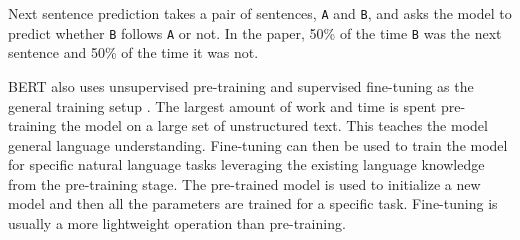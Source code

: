 \documentclass[twoside]{article}
\begin{document}
Next sentence prediction takes a pair of sentences, \texttt{A} and \texttt{B}, and asks the model
to predict whether \texttt{B} follows \texttt{A} or not. In the paper, 50\% of the time \texttt{B} 
was the next sentence and 50\% of the time it was not. \cite{devlin_bert_2019}

BERT also uses unsupervised pre-training and supervised fine-tuning as the general training setup \cite{devlin_bert_2019}.
The largest amount of work and time is spent pre-training the model on a large set of unstructured
text. This teaches the model general language understanding. Fine-tuning can then be used to 
train the model for specific natural language tasks leveraging the existing language knowledge 
from the pre-training stage. The pre-trained model is used to initialize a new model and 
then all the parameters are trained for a specific task. Fine-tuning is usually a more 
lightweight operation than pre-training. \cite{devlin_bert_2019}
\end{document}

